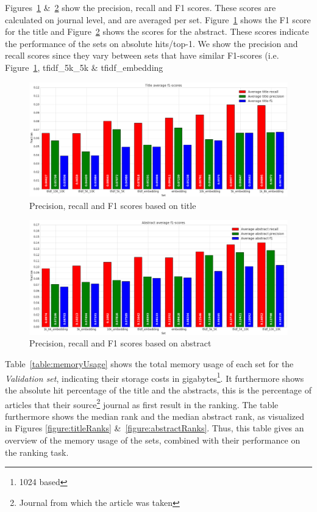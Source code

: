 \documentclass[../../Thesis.tex]{subfiles}
\begin{document}
\clearpage
{}
Figures~\ref{figure:f1Title} \&~\ref{figure:f1Abstract} show the precision, recall and F1 scores. These scores are calculated on journal level, and are averaged per set. Figure~\ref{figure:f1Title} shows the F1 score for the title and Figure~\ref{figure:f1Abstract} shows the scores for the abstract. These scores indicate the performance of the sets on absolute hits/top-1. We show the precision and recall scores since they vary between sets that have similar F1-scores (i.e. Figure~\ref{figure:f1Title}, tfidf\_5k\_5k \& tfidf\_embedding
\begin{figure}[hbt]
\includegraphics[width=6.5in]{Plots/Title_avg_f1}
\caption{Precision, recall and F1 scores based on title}\label{figure:f1Title}
\end{figure}
\begin{figure}[htb]
\includegraphics[width=6.5in]{Plots/Abstract_avg_f1}
\caption{Precision, recall and F1 scores based on abstract}\label{figure:f1Abstract}
\end{figure}
\clearpage
{}
Table~\ref{table:memoryUsage} shows the total memory usage of each set for the \textit{Validation set}, indicating their storage costs in gigabytes\footnote{1024 based}. It furthermore shows the absolute hit percentage of the title and the abstracts, this is the percentage of articles that their source\footnote{Journal from which the article was taken} journal as first result in the ranking. The table furthermore shows the median rank and the median abstract rank, as visualized in Figures \ref{figure:titleRanks} \&~\ref{figure:abstractRanks}. Thus, this table gives an overview of the memory usage of the sets, combined with their performance on the ranking task.\\
\end{document}
